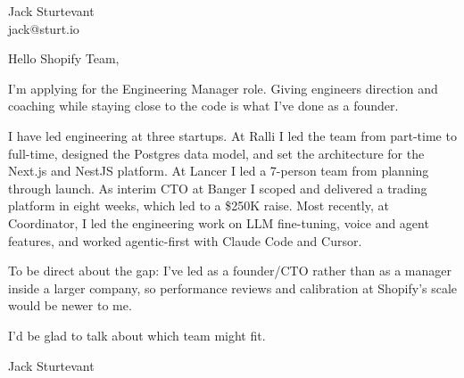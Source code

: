 \documentclass[11pt]{article}
\begin{document}
\raggedright

{\namefont\fontsize{20pt}{24pt}\selectfont Jack Sturtevant}\\[-0.3em]
jack@sturt.io

\vspace{1.2em}

Hello Shopify Team,

I'm applying for the Engineering Manager role. Giving engineers direction and coaching while staying close to the code is what I've done as a founder.

I have led engineering at three startups. At Ralli I led the team from part-time to full-time, designed the Postgres data model, and set the architecture for the Next.js and NestJS platform. At Lancer I led a 7-person team from planning through launch. As interim CTO at Banger I scoped and delivered a trading platform in eight weeks, which led to a \$250K raise. Most recently, at Coordinator, I led the engineering work on LLM fine-tuning, voice and agent features, and worked agentic-first with Claude Code and Cursor.

To be direct about the gap: I've led as a founder/CTO rather than as a manager inside a larger company, so performance reviews and calibration at Shopify's scale would be newer to me.

I'd be glad to talk about which team might fit.

\vspace{0.6em}
Jack Sturtevant
\end{document}
